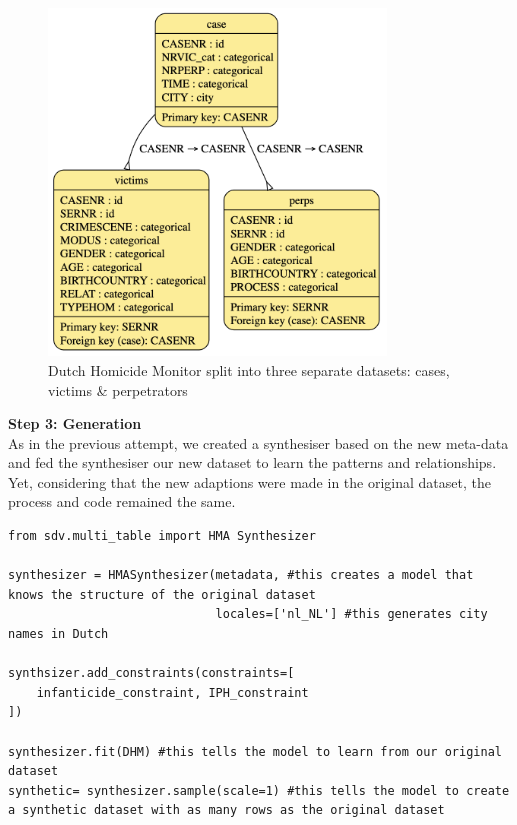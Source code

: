 \begin{figure}[H]
    \centering
    \includegraphics[width=0.8\textwidth]{Images/meta2.png}
    \caption{Dutch Homicide Monitor split into three separate datasets: cases, victims \& perpetrators}
    \label{fig:proof_1}
\end{figure}
\vspace{10pt}


\textbf{Step 3: Generation}\\
As in the previous attempt, we created a synthesiser based on the new meta-data and fed the synthesiser our new dataset to learn the patterns and relationships. Yet, considering that the new adaptions were made in the original dataset, the process and code remained the same.

\newpage
\begin{lstlisting}[caption={Synthetic Data Generation: Second Attempt}, label={lst:gen_first}]
from sdv.multi_table import HMA Synthesizer

synthesizer = HMASynthesizer(metadata, #this creates a model that knows the structure of the original dataset
                             locales=['nl_NL'] #this generates city names in Dutch

synthsizer.add_constraints(constraints=[
    infanticide_constraint, IPH_constraint
])

synthesizer.fit(DHM) #this tells the model to learn from our original dataset
synthetic= synthesizer.sample(scale=1) #this tells the model to create a synthetic dataset with as many rows as the original dataset
\end{lstlisting}
\vspace{10pt}


